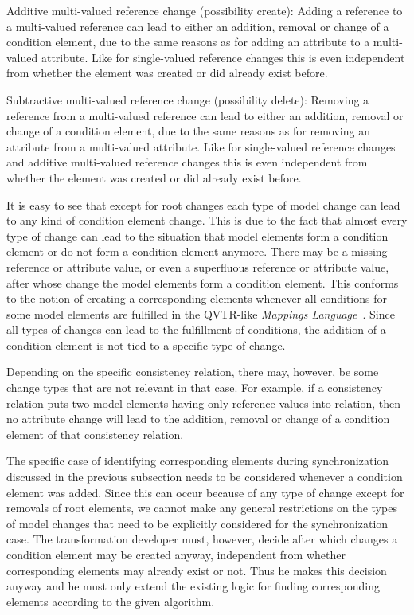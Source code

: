 \begin{properdescription}
    \item[Additive multi-valued reference change (possibility create):] Adding a reference to a multi-valued reference can lead to either an addition, removal or change of a condition element, due to the same reasons as for adding an attribute to a multi-valued attribute. Like for single-valued reference changes this is even independent from whether the element was created or did already exist before.
    \item[Subtractive multi-valued reference change (possibility delete):] Removing a reference from a multi-valued reference can lead to either an addition, removal or change of a condition element, due to the same reasons as for removing an attribute from a multi-valued attribute. Like for single-valued reference changes and additive multi-valued reference changes this is even independent from whether the element was created or did already exist before.
\end{properdescription}

It is easy to see that except for root changes each type of model change can lead to any kind of condition element change.
This is due to the fact that almost every type of change can lead to the situation that model elements form a condition element or do not form a condition element anymore.
There may be a missing reference or attribute value, or even a superfluous reference or attribute value, after whose change the model elements form a condition element.
This conforms to the notion of creating a corresponding elements whenever all conditions for some model elements are fulfilled in the \gls{QVTR}-like \emph{Mappings Language}~\cite[p. 283]{kramer2017a}.
Since all types of changes can lead to the fulfillment of conditions, the addition of a condition element is not tied to a specific type of change.

Depending on the specific consistency relation, there may, however, be some change types that are not relevant in that case.
For example, if a consistency relation puts two model elements having only reference values into relation, then no attribute change will lead to the addition, removal or change of a condition element of that consistency relation.

The specific case of identifying corresponding elements during synchronization discussed in the previous subsection needs to be considered whenever a condition element was added.
Since this can occur because of any type of change except for removals of root elements, we cannot make any general restrictions on the types of model changes that need to be explicitly considered for the synchronization case.
The transformation developer must, however, decide after which changes a condition element may be created anyway, independent from whether corresponding elements may already exist or not.
Thus he makes this decision anyway and he must only extend the existing logic for finding corresponding elements according to the given algorithm.

